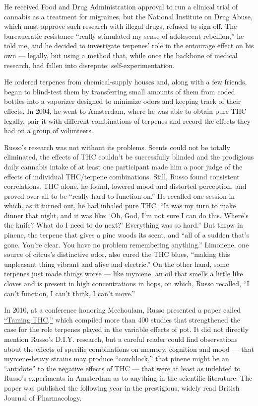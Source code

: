 He received Food and Drug Administration approval to run a clinical
trial of cannabis as a treatment for migraines, but the National
Institute on Drug Abuse, which must approve such research with illegal
drugs, refused to sign off. The bureaucratic resistance ``really
stimulated my sense of adolescent rebellion,'' he told me, and he
decided to investigate terpenes' role in the entourage effect on his own
--- legally, but using a method that, while once the backbone of medical
research, had fallen into disrepute: self-experimentation.

He ordered terpenes from chemical-supply houses and, along with a few
friends, began to blind-test them by transferring small amounts of them
from coded bottles into a vaporizer designed to minimize odors and
keeping track of their effects. In 2004, he went to Amsterdam, where he
was able to obtain pure THC legally, pair it with different combinations
of terpenes and record the effects they had on a group of volunteers.

Russo's research was not without its problems. Scents could not be
totally eliminated, the effects of THC couldn't be successfully blinded
and the prodigious daily cannabis intake of at least one participant
made him a poor judge of the effects of individual THC/terpene
combinations. Still, Russo found consistent correlations. THC alone, he
found, lowered mood and distorted perception, and proved over all to be
``really hard to function on.'' He recalled one session in which, as it
turned out, he had inhaled pure THC. ``It was my turn to make dinner
that night, and it was like: `Oh, God, I'm not sure I can do this.
Where's the knife? What do I need to do next?' Everything was so hard.''
But throw in pinene, the terpene that gives a pine woods its scent, and
``all of a sudden that's gone. You're clear. You have no problem
remembering anything.'' Limonene, one source of citrus's distinctive
odor, also cured the THC blues, ``making this unpleasant thing vibrant
and alive and electric.'' On the other hand, some terpenes just made
things worse --- like myrcene, an oil that smells a little like cloves
and is present in high concentrations in hops, on which, Russo recalled,
``I can't function, I can't think, I can't move.''

In 2010, at a conference honoring Mechoulam, Russo presented a paper
called
\href{https://www.ncbi.nlm.nih.gov/pmc/articles/PMC3165946/?_escaped_fragment_=po=31.2808}{``Taming
THC,''} which compiled more than 400 studies that strengthened the case
for the role terpenes played in the variable effects of pot. It did not
directly mention Russo's D.I.Y. research, but a careful reader could
find observations about the effects of specific combinations on memory,
cognition and mood --- that myrcene-heavy strains may produce
``couchlock,'' that pinene might be an ``antidote'' to the negative
effects of THC --- that were at least as indebted to Russo's experiments
in Amsterdam as to anything in the scientific literature. The paper was
published the following year in the prestigious, widely read British
Journal of Pharmacology.

